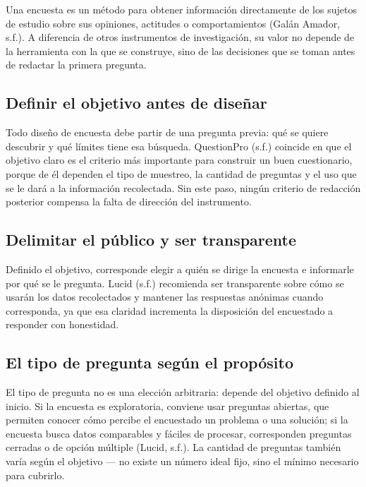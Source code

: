 \documentclass[
  spanish,
  12pt,
  letterpaper,
]{article}
\begin{document}
Una encuesta es un método para obtener información directamente de los
sujetos de estudio sobre sus opiniones, actitudes o comportamientos
(Galán Amador, s.f.). A diferencia de otros instrumentos de
investigación, su valor no depende de la herramienta con la que se
construye, sino de las decisiones que se toman antes de redactar la
primera pregunta.

\subsection{Definir el objetivo antes de
diseñar}\label{definir-el-objetivo-antes-de-diseuxf1ar}

Todo diseño de encuesta debe partir de una pregunta previa: qué se
quiere descubrir y qué límites tiene esa búsqueda. QuestionPro (s.f.)
coincide en que el objetivo claro es el criterio más importante para
construir un buen cuestionario, porque de él dependen el tipo de
muestreo, la cantidad de preguntas y el uso que se le dará a la
información recolectada. Sin este paso, ningún criterio de redacción
posterior compensa la falta de dirección del instrumento.

\subsection{Delimitar el público y ser
transparente}\label{delimitar-el-puxfablico-y-ser-transparente}

Definido el objetivo, corresponde elegir a quién se dirige la encuesta e
informarle por qué se le pregunta. Lucid (s.f.) recomienda ser
transparente sobre cómo se usarán los datos recolectados y mantener las
respuestas anónimas cuando corresponda, ya que esa claridad incrementa
la disposición del encuestado a responder con honestidad.

\subsection{El tipo de pregunta según el
propósito}\label{el-tipo-de-pregunta-seguxfan-el-propuxf3sito}

El tipo de pregunta no es una elección arbitraria: depende del objetivo
definido al inicio. Si la encuesta es exploratoria, conviene usar
preguntas abiertas, que permiten conocer cómo percibe el encuestado un
problema o una solución; si la encuesta busca datos comparables y
fáciles de procesar, corresponden preguntas cerradas o de opción
múltiple (Lucid, s.f.). La cantidad de preguntas también varía según el
objetivo --- no existe un número ideal fijo, sino el mínimo necesario
para cubrirlo.
\end{document}
